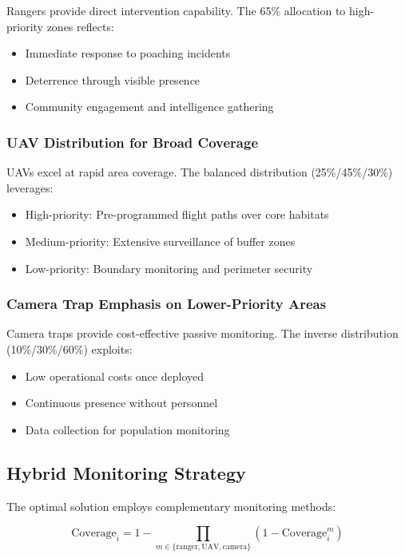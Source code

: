 Rangers provide direct intervention capability. The 65\% allocation to high-priority zones reflects:
\begin{itemize}
    \item Immediate response to poaching incidents
    \item Deterrence through visible presence
    \item Community engagement and intelligence gathering
\end{itemize}

\subsubsection{UAV Distribution for Broad Coverage}

UAVs excel at rapid area coverage. The balanced distribution (25\%/45\%/30\%) leverages:
\begin{itemize}
    \item High-priority: Pre-programmed flight paths over core habitats
    \item Medium-priority: Extensive surveillance of buffer zones
    \item Low-priority: Boundary monitoring and perimeter security
\end{itemize}

\subsubsection{Camera Trap Emphasis on Lower-Priority Areas}

Camera traps provide cost-effective passive monitoring. The inverse distribution (10\%/30\%/60\%) exploits:
\begin{itemize}
    \item Low operational costs once deployed
    \item Continuous presence without personnel
    \item Data collection for population monitoring
\end{itemize}

\subsection{Hybrid Monitoring Strategy}

The optimal solution employs complementary monitoring methods:

\begin{equation}
\text{Coverage}_i = 1 - \prod_{m \in \{\text{ranger}, \text{UAV}, \text{camera}\}} (1 - \text{Coverage}_i^m)
\label{eq:hybrid}
\end{equation}

